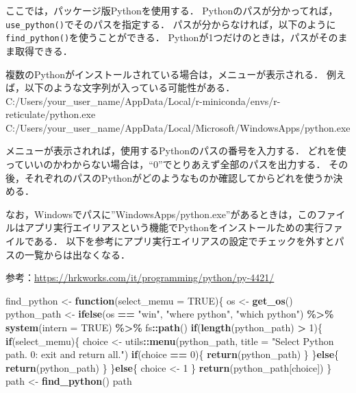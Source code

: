 \documentclass[
]{article}
\newenvironment{Shaded}{\begin{snugshade}}{\end{snugshade}}
\newcommand{\AttributeTok}[1]{\textcolor[rgb]{0.13,0.29,0.53}{#1}}
\newcommand{\ConstantTok}[1]{\textcolor[rgb]{0.56,0.35,0.01}{#1}}
\newcommand{\ControlFlowTok}[1]{\textcolor[rgb]{0.13,0.29,0.53}{\textbf{#1}}}
\newcommand{\DecValTok}[1]{\textcolor[rgb]{0.00,0.00,0.81}{#1}}
\newcommand{\FunctionTok}[1]{\textcolor[rgb]{0.13,0.29,0.53}{\textbf{#1}}}
\newcommand{\NormalTok}[1]{#1}
\newcommand{\OtherTok}[1]{\textcolor[rgb]{0.56,0.35,0.01}{#1}}
\newcommand{\SpecialCharTok}[1]{\textcolor[rgb]{0.81,0.36,0.00}{\textbf{#1}}}
\newcommand{\StringTok}[1]{\textcolor[rgb]{0.31,0.60,0.02}{#1}}
\begin{document}
ここでは，パッケージ版Pythonを使用する．
Pythonのパスが分かってれば，\texttt{use\_python()}でそのパスを指定する．
パスが分からなければ，以下のように\texttt{find\_python()}を使うことができる．
Pythonが1つだけのときは，パスがそのまま取得できる．

複数のPythonがインストールされている場合は，メニューが表示される．
例えば，以下のような文字列が入っている可能性がある．
C:/Users/your\_user\_name/AppData/Local/r-miniconda/envs/r-reticulate/python.exe
C:/Users/your\_user\_name/AppData/Local/Microsoft/WindowsApps/python.exe

メニューが表示されれば，使用するPythonのパスの番号を入力する．
どれを使っていいのかわからない場合は，``0''でとりあえず全部のパスを出力する．
その後，それぞれのパスのPythonがどのようなものか確認してからどれを使うか決める．

なお，Windowsでパスに''WindowsApps/python.exe''があるときは，このファイルはアプリ実行エイリアスという機能でPythonをインストールための実行ファイルである．
以下を参考にアプリ実行エイリアスの設定でチェックを外すとパスの一覧からは出なくなる．

参考：\url{https://hrkworks.com/it/programming/python/py-4421/}

\begin{Shaded}
\begin{Highlighting}[]
\NormalTok{find\_python }\OtherTok{\textless{}{-}} \ControlFlowTok{function}\NormalTok{(}\AttributeTok{select\_memu =} \ConstantTok{TRUE}\NormalTok{)\{}
\NormalTok{  os }\OtherTok{\textless{}{-}} \FunctionTok{get\_os}\NormalTok{()}
\NormalTok{  python\_path }\OtherTok{\textless{}{-}} 
    \FunctionTok{ifelse}\NormalTok{(os }\SpecialCharTok{==} \StringTok{"win"}\NormalTok{, }\StringTok{"where python"}\NormalTok{, }\StringTok{"which python"}\NormalTok{) }\SpecialCharTok{\%\textgreater{}\%}
    \FunctionTok{system}\NormalTok{(}\AttributeTok{intern =} \ConstantTok{TRUE}\NormalTok{) }\SpecialCharTok{\%\textgreater{}\%}
\NormalTok{    fs}\SpecialCharTok{::}\FunctionTok{path}\NormalTok{()}
  \ControlFlowTok{if}\NormalTok{(}\FunctionTok{length}\NormalTok{(python\_path) }\SpecialCharTok{\textgreater{}} \DecValTok{1}\NormalTok{)\{}
    \ControlFlowTok{if}\NormalTok{(select\_memu)\{}
\NormalTok{      choice }\OtherTok{\textless{}{-}}\NormalTok{ utils}\SpecialCharTok{::}\FunctionTok{menu}\NormalTok{(python\_path, }\AttributeTok{title =} \StringTok{"Select Python path. 0: exit and return all."}\NormalTok{)}
      \ControlFlowTok{if}\NormalTok{(choice }\SpecialCharTok{==} \DecValTok{0}\NormalTok{)\{ }\FunctionTok{return}\NormalTok{(python\_path) \}}
\NormalTok{    \}}\ControlFlowTok{else}\NormalTok{\{}
      \FunctionTok{return}\NormalTok{(python\_path)}
\NormalTok{    \}}
\NormalTok{  \}}\ControlFlowTok{else}\NormalTok{\{}
\NormalTok{    choice }\OtherTok{\textless{}{-}} \DecValTok{1}
\NormalTok{  \}}
  \FunctionTok{return}\NormalTok{(python\_path[choice])}
\NormalTok{\}}
\NormalTok{path }\OtherTok{\textless{}{-}} \FunctionTok{find\_python}\NormalTok{()}
\NormalTok{path}
\end{Highlighting}
\end{Shaded}
\end{document}
